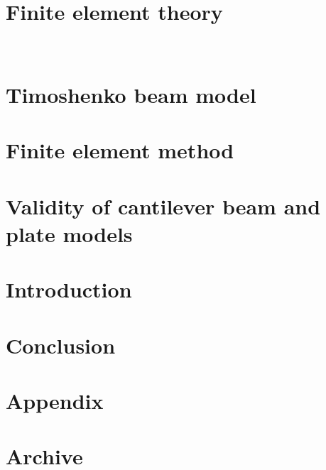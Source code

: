 \documentclass[12pt]{report}
\begin{document}
\chapter{Finite element theory}


\

\chapter{Timoshenko beam model}
 






\chapter{Finite element method}




\chapter{Validity of cantilever beam and plate models}




\chapter{Introduction}


\chapter{Conclusion}


\printbibliography


\chapter*{Appendix}



\chapter*{Archive}


%

\end{document}
